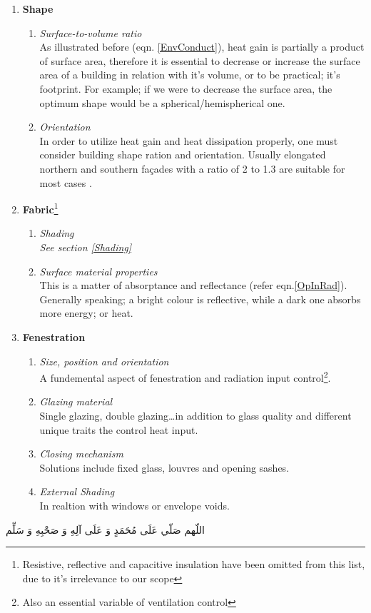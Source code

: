 \documentclass[a4paper,twoside,12pt,openright,final,oldfontcommands]{memoir}
\begin{document}
\begin{enumerate}
  \item \textbf{Shape}
  	\begin{enumerate}
    	\item \emph{Surface-to-volume ratio}\\ As illustrated before (eqn. \ref{EnvConduct}), heat gain
    	is partially a product of surface area, therefore it is essential to decrease or increase the
    	surface area of a building in relation with it's volume, or to be practical; it's footprint.
   		For example; if we were to decrease the surface area, the optimum shape would be a
    	spherical/hemispherical one. 
    	\item \emph{Orientation}\\ In order to utilize heat gain and heat dissipation properly, one
    	must consider building shape ration and orientation. Usually elongated northern and southern
    	fa\c{c}ades with a ratio of 2 to 1.3 are suitable for most cases \cite{szokolay08}.
  	\end{enumerate}
  \item \textbf{Fabric}\footnote{Resistive, reflective and capacitive insulation have been
  omitted from this list, due to it's irrelevance to our scope}
  	\begin{enumerate}
    	\item \emph{Shading}\\ \emph{See section \ref{Shading}}
    	\item \emph{Surface material properties}\\ This is a matter of absorptance and reflectance
    	(refer eqn.\ref{OpInRad}). Generally speaking; a bright colour is reflective, while a dark
    	one absorbs more energy; or heat.
  \end{enumerate}
  \item \textbf{Fenestration}
  	\begin{enumerate}
  	  \item \emph{Size, position and orientation}\\ A fundemental aspect of fenestration and
  	  radiation input control\footnote{Also an essential variable of ventilation control}.
  	  \item \emph{Glazing material}\\ Single glazing, double glazing\ldots in addition to glass
  	  quality and different unique traits the control heat input.
  	  \item \emph{Closing mechanism}\\ Solutions include fixed glass, louvres and opening sashes.
  	  \item \emph{External Shading}\\ In realtion with windows or envelope voids.
  	\end{enumerate}
\end{enumerate}

\begin{arabtext}
{\footnotesize اللّهم صَلّي عَلَى مُحَمَدٍ وَ عَلَى آلِهِ وَ صَحْبِهِ وَ سَلِّم}  
\end{arabtext}



\end{document}
